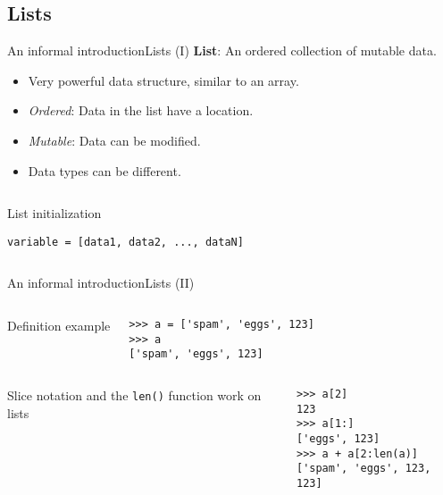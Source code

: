 \documentclass[10pt,compress]{beamer} %
\begin{document}
\subsection{Lists}
\begin{frame}[fragile]{An informal introduction}{Lists (I)}
	\textbf{List}: An ordered collection of mutable data.
	\begin{itemize}
		\item Very powerful data structure, similar to an array.
		\item \textit{Ordered}: Data in the list have a location.
		\item \textit{Mutable}: Data can be modified.
		\item Data types can be different.
	\end{itemize}
	\begin{columns}
		\begin{block}{List initialization}
		\begin{verbatim}
variable = [data1, data2, ..., dataN]
\end{verbatim}
		\end{block}
	\end{columns}
\end{frame}

\begin{frame}[fragile]{An informal introduction}{Lists (II)}
	\begin{columns}
 	   	\column{.40\textwidth}
		Definition example

   		\column{.60\textwidth}
		\begin{block}{}
		\begin{verbatim}
>>> a = ['spam', 'eggs', 123]
>>> a
['spam', 'eggs', 123]
\end{verbatim}
		\end{block}
	\end{columns}

	\begin{columns}
		Slice notation and the \texttt{len()} function work on lists

		\begin{block}{}
		\begin{verbatim}
>>> a[2]
123
>>> a[1:]
['eggs', 123]
>>> a + a[2:len(a)]
['spam', 'eggs', 123, 123]
\end{verbatim}
		\end{block}
	\end{columns}
\end{frame}
\end{document}
